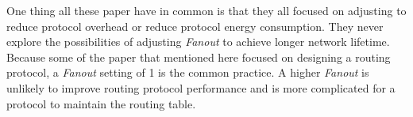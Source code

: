 
One thing all these paper have in common is that they all focused on adjusting \emph{\pog} to reduce protocol overhead or reduce protocol energy consumption. They never explore the possibilities of adjusting \emph{Fanout} to achieve longer network lifetime. Because some of the paper that mentioned here focused on designing a routing protocol, a \emph{Fanout} setting of 1 is the common practice. A higher \emph{Fanout} is unlikely to improve routing protocol performance and is more complicated for a protocol to maintain the routing table. 






